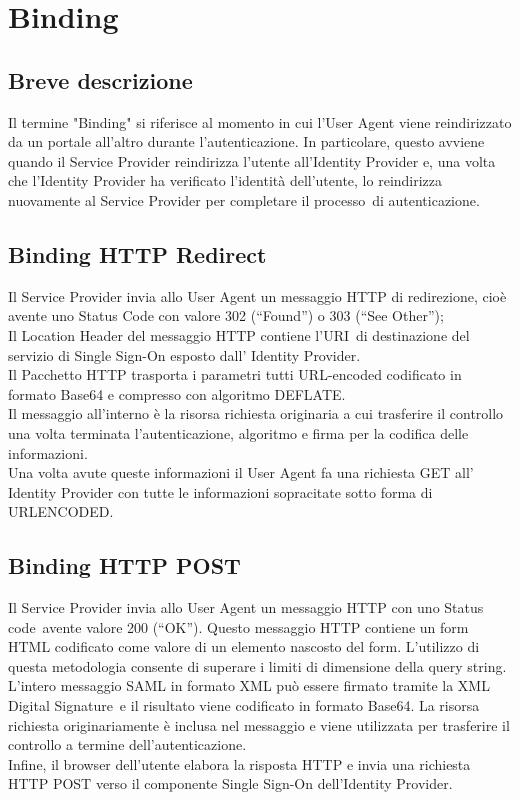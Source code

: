 \section{Binding}
\subsection{Breve descrizione}
Il termine "Binding" si riferisce al momento in cui l'User Agent viene reindirizzato da un portale all'altro durante l'autenticazione. 
In particolare, questo avviene quando il Service Provider reindirizza l'utente all'Identity Provider e, una volta che l'Identity 
Provider ha verificato l'identità dell'utente, lo reindirizza nuovamente al Service Provider per completare il processo\glo\ di 
autenticazione.
\subsection{Binding HTTP Redirect}
Il Service Provider invia allo User Agent un messaggio HTTP di redirezione, cioè avente uno Status Code con
valore 302 (“Found”) o 303 (“See Other”);
\\ Il Location Header del messaggio HTTP contiene l’URI\glo\ di destinazione del servizio di Single
Sign-On esposto dall’ Identity Provider.
\\ Il Pacchetto HTTP trasporta i parametri tutti URL-encoded codificato in formato
Base64 e compresso con algoritmo DEFLATE\glo.
\\ Il messaggio all'interno è la risorsa richiesta originaria a cui 
trasferire il controllo una volta terminata l'autenticazione, 
algoritmo e firma per la codifica delle informazioni.
\\ Una volta avute queste informazioni il User Agent fa una 
richiesta GET all' Identity Provider con tutte le informazioni 
sopracitate sotto forma di URLENCODED\glo.

\subsection{Binding HTTP POST}
Il Service Provider invia allo User Agent un messaggio HTTP con uno Status code\glo\ avente valore 200 (“OK”). 
Questo messaggio HTTP contiene un form HTML codificato come valore di un elemento nascosto del form. 
L'utilizzo di questa metodologia consente di superare i limiti di dimensione della query string. \\
L’intero messaggio SAML in formato XML può essere firmato tramite la XML Digital Signature\glo\ e il risultato viene codificato 
in formato Base64. La risorsa richiesta originariamente è inclusa nel messaggio e viene utilizzata per trasferire il controllo 
a termine dell'autenticazione.\\
Infine, il browser dell’utente elabora la risposta HTTP e invia una richiesta HTTP POST verso il componente Single Sign-On 
dell’Identity Provider.
